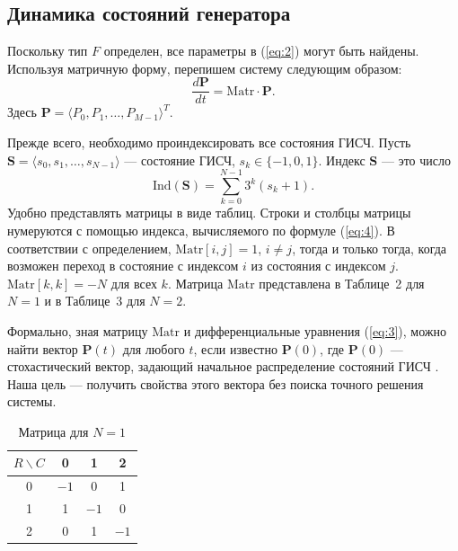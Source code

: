 \documentclass[a4paper,12pt]{article}
\begin{document}
\subsection{Динамика состояний генератора}

Поскольку тип $F$ определен, все параметры в (\ref{eq:2}) могут быть найдены. Используя матричную форму, перепишем систему следующим образом:
\begin{equation}
\frac{d\mathbf{P}}{dt} = \mathrm{Matr}\cdot \mathbf{P}.
\label{eq:3}
\end{equation}
Здесь $\mathbf{P} = \langle P_0, P_1, \ldots, P_{M-1}\rangle^T$.

Прежде всего, необходимо проиндексировать все состояния ГИСЧ. Пусть $\mathbf{S} = \langle s_0, s_1, \ldots, s_{N-1}\rangle$ --- состояние ГИСЧ, $s_k\in\{-1,0,1\}$. Индекс $\mathbf{S}$ --- это число
\begin{equation}
\mathrm{Ind}(\mathbf{S}) = \sum_{k=0}^{N-1} 3^k (s_k + 1).
\label{eq:4}
\end{equation}
Удобно представлять матрицы в виде таблиц. Строки и столбцы матрицы нумеруются с помощью индекса, вычисляемого по формуле (\ref{eq:4}). В соответствии с определением, $\mathrm{Matr}[i,j] = 1$, $i\neq j$, тогда и только тогда, когда возможен переход в состояние с индексом $i$ из состояния с индексом $j$. $\mathrm{Matr}[k,k] = -N$ для всех $k$. Матрица $\mathrm{Matr}$ представлена в Таблице~2 для $N=1$ и в Таблице~3 для $N=2$.

Формально, зная матрицу $\mathrm{Matr}$ и дифференциальные уравнения (\ref{eq:3}), можно найти вектор $\mathbf{P}(t)$ для любого $t$, если известно $\mathbf{P}(0)$, где $\mathbf{P}(0)$ --- стохастический вектор, задающий начальное распределение состояний ГИСЧ \cite{bellman1960}. Наша цель --- получить свойства этого вектора без поиска точного решения системы.

\begin{table}[h]
\centering
\caption{Матрица для $N=1$}
\label{tab:2}
\begin{tabular}{c|ccc}
$R\backslash C$ & 0 & 1 & 2 \\ \hline
0 & $-1$ & 0 & 1 \\
1 & 1 & $-1$ & 0 \\
2 & 0 & 1 & $-1$
\end{tabular}
\end{table}
\end{document}
